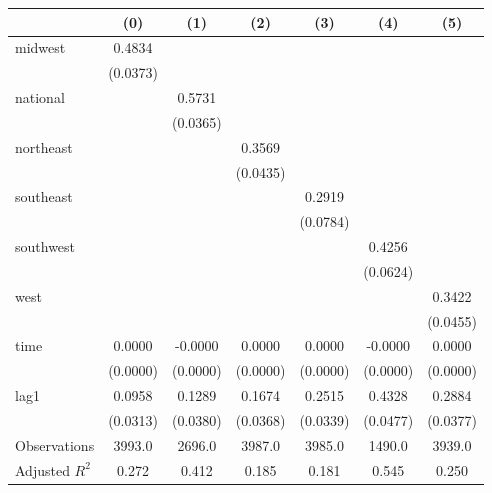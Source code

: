 \begin{tabular}{lcccccc}
\toprule
 & (0) & (1) & (2) & (3) & (4) & (5) \\
\midrule
midwest & 0.4834 &  &  &  &  &  \\
\vspace{0.2cm}
 & (0.0373) &  &  &  &  &  \\
national &  & 0.5731 &  &  &  &  \\
\vspace{0.2cm}
 &  & (0.0365) &  &  &  &  \\
northeast &  &  & 0.3569 &  &  &  \\
\vspace{0.2cm}
 &  &  & (0.0435) &  &  &  \\
southeast &  &  &  & 0.2919 &  &  \\
\vspace{0.2cm}
 &  &  &  & (0.0784) &  &  \\
southwest &  &  &  &  & 0.4256 &  \\
\vspace{0.2cm}
 &  &  &  &  & (0.0624) &  \\
west &  &  &  &  &  & 0.3422 \\
\vspace{0.2cm}
 &  &  &  &  &  & (0.0455) \\
time & 0.0000 & -0.0000 & 0.0000 & 0.0000 & -0.0000 & 0.0000 \\
\vspace{0.2cm}
 & (0.0000) & (0.0000) & (0.0000) & (0.0000) & (0.0000) & (0.0000) \\
lag1 & 0.0958 & 0.1289 & 0.1674 & 0.2515 & 0.4328 & 0.2884 \\
\vspace{0.2cm}
 & (0.0313) & (0.0380) & (0.0368) & (0.0339) & (0.0477) & (0.0377) \\
\midrule
Observations & 3993.0 & 2696.0 & 3987.0 & 3985.0 & 1490.0 & 3939.0 \\
Adjusted $R^2$ & 0.272 & 0.412 & 0.185 & 0.181 & 0.545 & 0.250 \\
\bottomrule
\end{tabular}